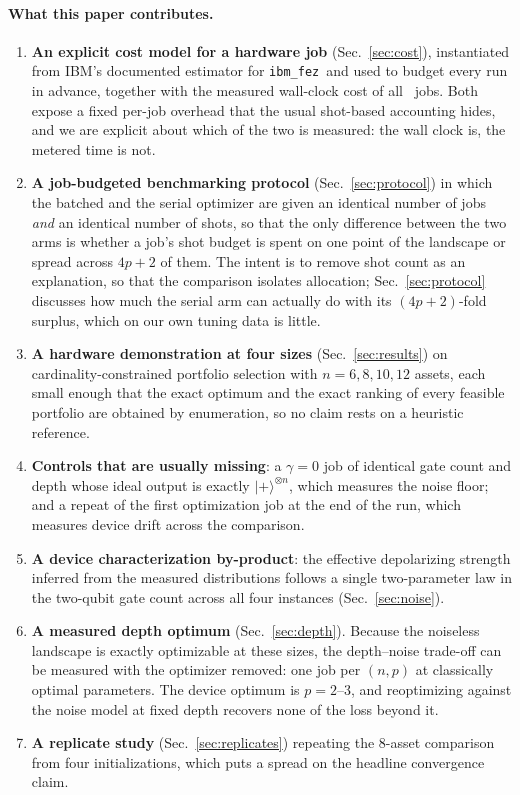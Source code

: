 \documentclass[aps,prx,preprint,superscriptaddress,nofootinbib,longbibliography]{revtex4-2}
\providecommand{\ket}[1]{|#1\rangle}
\newcommand{\ibmfez}{\texttt{ibm\_fez}}
\begin{document}
\paragraph*{What this paper contributes.}
\begin{enumerate}
\item \textbf{An explicit cost model for a hardware job} (Sec.~\ref{sec:cost}),
      instantiated from IBM's documented estimator for \ibmfez\ and used to budget every run in
      advance, together with the measured wall-clock cost of all \alljobs\ jobs. Both expose a
      fixed per-job overhead that the usual shot-based accounting hides, and we are explicit
      about which of the two is measured: the wall clock is, the metered time is not.
\item \textbf{A job-budgeted benchmarking protocol} (Sec.~\ref{sec:protocol}) in which the
      batched and the serial optimizer are given an identical number of jobs \emph{and} an
      identical number of shots, so that the only difference between the two arms is whether
      a job's shot budget is spent on one point of the landscape or spread across $4p+2$ of
      them. The intent is to remove shot count as an explanation, so that the comparison
      isolates allocation; Sec.~\ref{sec:protocol} discusses how much the serial arm can
      actually do with its $(4p+2)$-fold surplus, which on our own tuning data is little.
\item \textbf{A hardware demonstration at four sizes} (Sec.~\ref{sec:results}) on
      cardinality-constrained portfolio selection with $n = 6, 8, 10, 12$ assets, each small
      enough that the exact optimum and the exact ranking of every feasible portfolio are
      obtained by enumeration, so no claim rests on a heuristic reference.
\item \textbf{Controls that are usually missing}: a $\gamma = 0$ job of identical gate count
      and depth whose ideal output is exactly $\ket{+}^{\otimes n}$, which measures the noise
      floor; and a repeat of the first optimization job at the end of the run, which measures
      device drift across the comparison.
\item \textbf{A device characterization by-product}: the effective depolarizing strength
      inferred from the measured distributions follows a single two-parameter law in the
      two-qubit gate count across all four instances (Sec.~\ref{sec:noise}).
\item \textbf{A measured depth optimum} (Sec.~\ref{sec:depth}). Because the noiseless landscape
      is exactly optimizable at these sizes, the depth--noise trade-off can be measured with the
      optimizer removed: one job per $(n,p)$ at classically optimal parameters. The device
      optimum is $p = 2$--$3$, and reoptimizing against the noise model at fixed depth recovers
      none of the loss beyond it.
\item \textbf{A replicate study} (Sec.~\ref{sec:replicates}) repeating the $8$-asset comparison
      from four initializations, which puts a spread on the headline convergence claim.
\end{enumerate}
\end{document}
